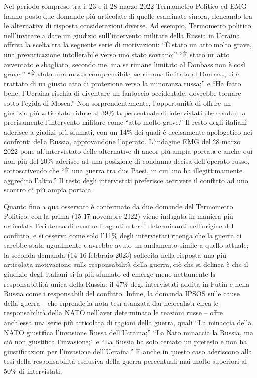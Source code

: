 \documentclass[
  openany]{book}
\begin{document}
Nel periodo compreso tra il 23 e il 28 marzo 2022 Termometro Politico ed EMG hanno posto due domande più articolate di quelle esaminate sinora, elencando tra le alternative di risposta considerazioni diverse. Ad esempio, Termometro politico nell'invitare a dare un giudizio sull'intervento militare della Russia in Ucraina offriva la scelta tra la seguente serie di motivazioni: ``È stato un atto molto grave, una prevaricazione intollerabile verso uno stato sovrano;'' ``È stato un atto avventato e sbagliato, secondo me, ma se rimane limitato al Donbass non è così grave;'' ``È stata una mossa comprensibile, se rimane limitata al Donbass, si è trattato di un giusto atto di protezione verso la minoranza russa;'' e ``Ha fatto bene, l'Ucraina rischia di diventare un fantoccio occidentale, dovrebbe tornare sotto l'egida di Mosca.'' Non sorprendentemente, l'opportunità di offrire un giudizio più articolato riduce al 39\% la percentuale di intervistati che condanna precisamente l'intervento militare come ``atto molto grave.'' Il resto degli italiani aderisce a giudizi più sfumati, con un 14\% dei quali è decisamente apologetico nei confronti della Russia, approvandone l'operato. L'indagine EMG del 28 marzo 2022 pone all'intervistato delle alternative di ancor più ampia portata e anche qui non più del 20\% aderisce ad una posizione di condanna decisa dell'operato russo, sottoscrivendo che ``È una guerra tra due Paesi, in cui uno ha illegittimamente aggredito l'altro.'' Il resto degli intervistati preferisce ascrivere il conflitto ad uno scontro di più ampia portata.

Quanto fino a qua osservato è confermato da due domande del Termometro Politico: con la prima (15-17 novembre 2022) viene indagata in maniera più articolata l'esistenza di eventuali agenti esterni determinanti nell'origine del conflitto, e si osserva come solo l'11\% degli intervistati ritenga che la guerra ci sarebbe stata ugualmente e avrebbe avuto un andamento simile a quello attuale; la seconda domanda (14-16 febbraio 2023) sollecita nella risposta una più articolata motivazione sulle responsabilità della guerra, ciò che si delinea è che il giudizio degli italiani si fa più sfumato ed emerge meno nettamente la responsabitlità unica della Russia: il 47\% degl intervistati addita in Putin e nella Russia come i responsabili del conflitto. Infine, la domanda IPSOS sulle cause della guerra -- che riprende la nota tesi avanzata dai neorealisti circa le responsabilità della NATO nell'aver determinato le reazioni russe -- offre anch'essa una serie più articolata di ragioni della guerra, quali ``La minaccia della NATO giustifica l'invasione Russa dell'Ucraina;'' ``La Nato minaccia la Russia, ma ciò non giustifica l'invasione;'' e ``La Russia ha solo cercato un pretesto e non ha giustificazioni per l'invasione dell'Ucraina.'' E anche in questo caso aderiscono alla tesi della responsabilità esclusiva della guerra percentuali mai molto superiori al 50\% di intervistati.
\end{document}
